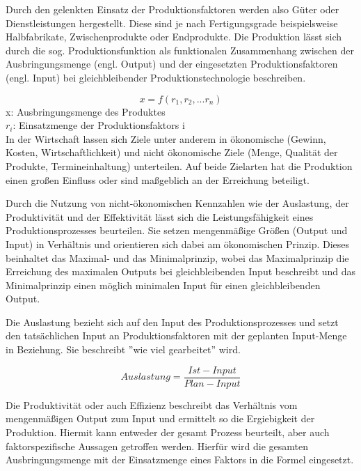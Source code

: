 \documentclass[a4paper,12pt, german]{report}
\begin{document}
Durch den gelenkten Einsatz der Produktionsfaktoren werden also Güter oder Dienstleistungen hergestellt. Diese sind je nach Fertigungsgrade beispielsweise Halbfabrikate, Zwischenprodukte oder Endprodukte.\cite{12}
Die Produktion lässt sich durch die sog. Produktionsfunktion als funktionalen Zusammenhang zwischen der Ausbringungsmenge (engl. Output) und der eingesetzten Produktionsfaktoren (engl. Input) bei gleichbleibender Produktionstechnologie beschreiben. \cite{20}

\begin{equation}
  x = f(r_1,r_2,...r_n) 
\end{equation}
x: Ausbringungsmenge des Produktes \\
$r_{i}$: Einsatzmenge der Produktionsfaktors i \\



In der Wirtschaft lassen sich Ziele unter anderem in ökonomische (Gewinn, Kosten, Wirtschaftlichkeit) und nicht ökonomische Ziele (Menge, Qualität der Produkte, Termineinhaltung) unterteilen. Auf beide Zielarten hat die Produktion einen großen Einfluss oder sind maßgeblich an der Erreichung beteiligt.

Durch die Nutzung von nicht-ökonomischen Kennzahlen wie der Auslastung, der Produktivität und der Effektivität lässt sich die Leistungsfähigkeit eines Produktionsprozesses beurteilen. Sie setzen mengenmäßige Größen (Output und Input) in Verhältnis und orientieren sich dabei am ökonomischen Prinzip. Dieses beinhaltet das Maximal- und das Minimalprinzip, wobei das Maximalprinzip die Erreichung des maximalen Outputs bei gleichbleibenden Input beschreibt und das Minimalprinzip einen möglich minimalen Input für einen gleichbleibenden Output. 

Die Auslastung bezieht sich auf den Input des Produktionsprozesses und setzt den tatsächlichen Input an Produktionsfaktoren mit der geplanten Input-Menge in Beziehung. Sie beschreibt ''wie viel gearbeitet'' wird. \cite{20}

\begin{equation}
  Auslastung =\frac{Ist-Input}{Plan-Input}
\end{equation}

Die Produktivität oder auch Effizienz beschreibt das Verhältnis vom mengenmäßigen Output zum Input und ermittelt so die Ergiebigkeit der Produktion. Hiermit kann entweder der gesamt Prozess beurteilt, aber auch faktorspezifische Aussagen getroffen werden. Hierfür wird die gesamten Ausbringungsmenge mit der Einsatzmenge eines Faktors in die Formel eingesetzt. \cite{20}
\end{document}
